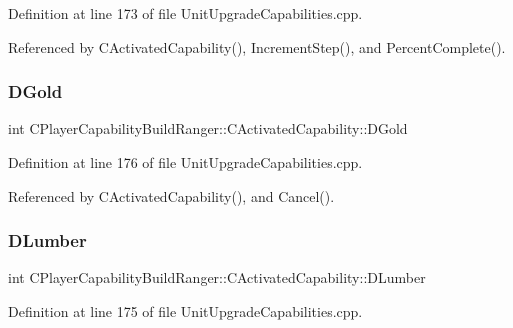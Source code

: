 Definition at line 173 of file Unit\+Upgrade\+Capabilities.\+cpp.



Referenced by C\+Activated\+Capability(), Increment\+Step(), and Percent\+Complete().

\hypertarget{classCPlayerCapabilityBuildRanger_1_1CActivatedCapability_a1943b07bf35da2a475fd1bb36ca777ab}{}\label{classCPlayerCapabilityBuildRanger_1_1CActivatedCapability_a1943b07bf35da2a475fd1bb36ca777ab} 
\subsubsection{\texorpdfstring{D\+Gold}{DGold}}
{\footnotesize\ttfamily int C\+Player\+Capability\+Build\+Ranger\+::\+C\+Activated\+Capability\+::\+D\+Gold\hspace{0.3cm}{\ttfamily [protected]}}



Definition at line 176 of file Unit\+Upgrade\+Capabilities.\+cpp.



Referenced by C\+Activated\+Capability(), and Cancel().

\hypertarget{classCPlayerCapabilityBuildRanger_1_1CActivatedCapability_a149028982faf1d393580d5d57bf4da03}{}\label{classCPlayerCapabilityBuildRanger_1_1CActivatedCapability_a149028982faf1d393580d5d57bf4da03} 
\subsubsection{\texorpdfstring{D\+Lumber}{DLumber}}
{\footnotesize\ttfamily int C\+Player\+Capability\+Build\+Ranger\+::\+C\+Activated\+Capability\+::\+D\+Lumber\hspace{0.3cm}{\ttfamily [protected]}}



Definition at line 175 of file Unit\+Upgrade\+Capabilities.\+cpp.



